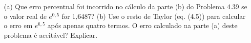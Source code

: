 (a) Que erro percentual foi incorrido no cálculo da parte (b) do Problema 4.39 se o valor real de $e^{0,5}$ for 1,6487? (b) Use o resto de Taylor (eq. (4.5)) para calcular o erro em $e^{0,5}$ após apenas quatro termos. O erro calculado na parte (a) deste problema é aceitável? Explicar.


